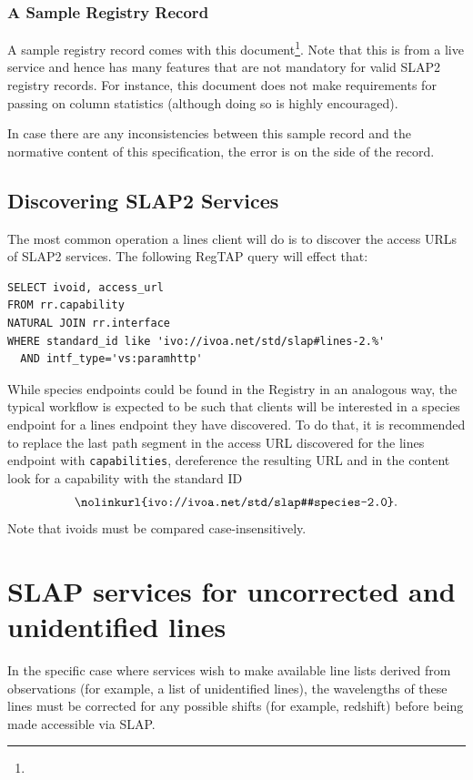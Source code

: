 \documentclass[11pt,a4paper]{ivoa}
\begin{document}
\subsubsection{A Sample Registry Record}

A sample registry record comes with this
document\footnote{}.  Note that this
is from a live service and hence has many features that are not
mandatory for valid SLAP2 registry records.  For instance, this document
does not make requirements for passing on column statistics (although
doing so is highly encouraged).

In case there are any inconsistencies between this sample record and the
normative content of this specification, the error is on the side of the
record.

\subsection{Discovering SLAP2 Services}

The most common operation a lines client will do is to discover the
access URLs of SLAP2 services.  The following RegTAP query will effect
that:

\begin{lstlisting}[basicstyle=\ttfamily]
SELECT ivoid, access_url
FROM rr.capability
NATURAL JOIN rr.interface
WHERE standard_id like 'ivo://ivoa.net/std/slap#lines-2.%'
  AND intf_type='vs:paramhttp'
\end{lstlisting}

While species endpoints could be found in the Registry in an analogous
way, the typical workflow is expected to be such that clients will be
interested in a species endpoint for a lines endpoint they have
discovered.  To do that, it is recommended to replace the last path
segment in the access URL discovered for the lines endpoint with
\texttt{capabilities}, dereference the resulting URL and in the content
look for a capability with the standard ID $$
\hbox{\nolinkurl{ivo://ivoa.net/std/slap#species-2.0}}.$$  Note that
ivoids must be compared case-insensitively.

\appendix

\section{SLAP services for uncorrected and unidentified lines}
\label{app:unidentified}

In the specific case where services wish to make available line lists derived from observations
(for example, a list of unidentified lines), the wavelengths of these lines must be corrected for
any possible shifts (for example, redshift) before being made accessible via SLAP.
\end{document}
